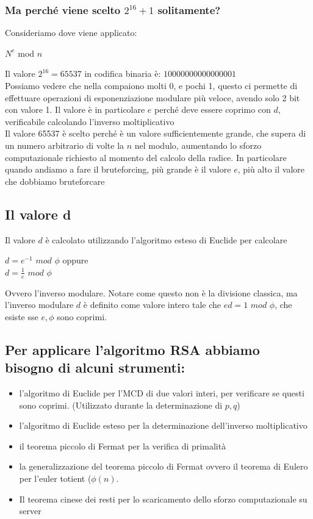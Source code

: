 \documentclass[11pt, oneside]{article}   	%
\begin{document}
\subsubsection*{Ma perché viene scelto $2^{16}+1$ solitamente?}
Consideriamo dove viene applicato: 
\begin{center}
$N^e$ mod $n$
\end{center}
Il valore $2^{16} = 65537$ in codifica binaria è: $10000000000000001$\\
Possiamo vedere che nella compaiono molti 0, e pochi 1, questo ci permette di effettuare operazioni di esponenziazione modulare più veloce, avendo solo 2 bit con valore 1.
Il valore è in particolare $e$ perché deve essere coprimo con $d$, verificabile calcolando l'inverso moltiplicativo \\
Il valore 65537 è scelto perché è un valore sufficientemente grande, che supera di un numero arbitrario di volte la $n$ nel modulo, aumentando lo sforzo computazionale richiesto al momento del calcolo della radice. In particolare quando andiamo a fare il bruteforcing, più grande è il valore $e$, più alto il valore che dobbiamo bruteforcare
\subsection*{Il valore d}
Il valore $d$ è calcolato utilizzando l'algoritmo esteso di Euclide per calcolare \begin{center}
$d = e^{-1}$ $mod$ $\phi$ oppure\\
$d = \frac{1}{e}$ $mod$ $\phi$
\end{center}
Ovvero l'inverso modulare. Notare come questo non è la divisione classica, ma l'inverso modulare $d$ è definito come valore intero tale che $ed = 1$ $mod$ $\phi$, che esiste sse $e, \phi$ sono coprimi.

\subsection*{Per applicare l'algoritmo RSA abbiamo bisogno di alcuni strumenti:}
\begin{itemize}
\item l'algoritmo di Euclide per l'MCD di due valori interi, per verificare se questi sono coprimi. (Utilizzato durante la determinazione di $p, q$)
\item l'algoritmo di Euclide esteso per la determinazione dell'inverso moltiplicativo
\item il teorema piccolo di Fermat per la verifica di primalità
\item la generalizzazione del teorema piccolo di Fermat ovvero il teorema di Eulero per l'euler totient ($\phi(n)$.
\item Il teorema cinese dei resti per lo scaricamento dello sforzo computazionale su server

\end{itemize}
\end{document}
